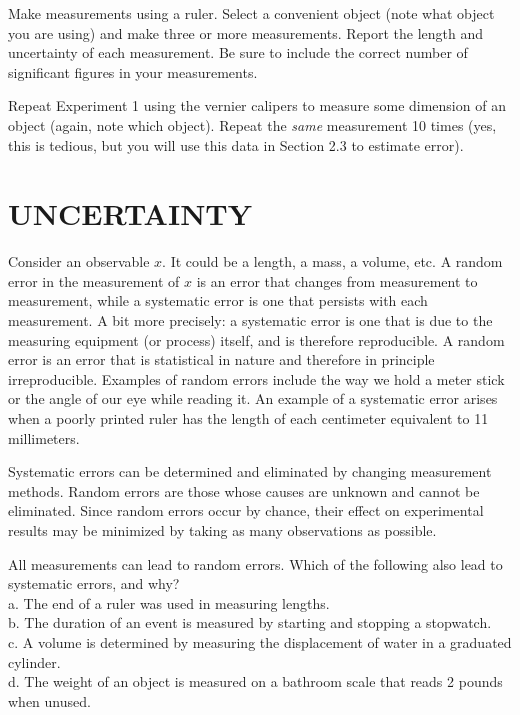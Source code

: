 \documentclass[11pt,letterpaper]{article}
\newcounter{question}[section]
\begin{document}
\clearpage
\question{} Make measurements using a ruler. Select a convenient object (note what object you are using) and make three or more measurements. Report the length and uncertainty of each measurement. Be sure to include the correct number of significant figures in your measurements.
\vspace{6cm}


\question{} Repeat Experiment 1 using the vernier calipers to measure some dimension of an object (again, note which object). Repeat the \textit{same} measurement 10 times (yes, this is tedious, but you will use this data in Section 2.3 to estimate error).



\section{UNCERTAINTY}
Consider an observable $x$. It could be a length, a mass, a volume, etc. A random error in the measurement of $x$
is an error that changes from measurement to measurement, while a
systematic error is one that persists with each measurement.  A bit
more precisely:  a systematic error is one that is due to the
measuring equipment (or process) itself, and is therefore
reproducible.  A random error is an error that is
statistical in nature and therefore in principle irreproducible.
Examples of random errors include the way we hold a meter stick or the
angle of our eye while reading it.  An example of a systematic error
arises when a poorly printed ruler has the length of each centimeter
equivalent to 11 millimeters.

Systematic errors can be determined and eliminated by changing measurement methods.  Random errors are those whose causes are unknown and cannot be eliminated.  Since random errors occur by chance, their effect on experimental results may be minimized by taking as many observations as possible.

\question{} All measurements can lead to random errors. Which of the following also lead to systematic errors, and why?\\
a. The end of a ruler was used in measuring lengths.\\
b. The duration of an event is measured by starting and stopping a stopwatch.\\
c. A volume is determined by measuring the displacement of water in a
graduated cylinder.\\
d. The weight of an object is measured on a bathroom scale that reads 2 pounds when unused.\\
\vspace{6cm}
\end{document}

